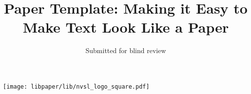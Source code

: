 \documentclass[twocolumn]{arxiv}
\begin{document}
 \title{Paper Template: Making it Easy to Make Text Look Like a Paper}

 \author{Submitted for blind review}
 \date{}

 \begin{abstract}
 \lipsum[1]
 \end{abstract}

 \maketitle



 \thispagestyle{fancy}



\pagebreak


\texttt{[image: libpaper/lib/nvsl\_logo\_square.pdf]}
\end{document}
